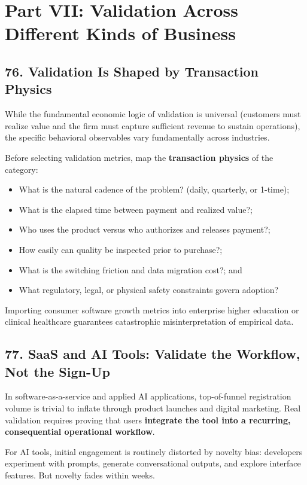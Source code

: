 \section*{Part VII: Validation Across Different Kinds of Business}

\subsection*{76. Validation Is Shaped by Transaction Physics}

While the fundamental economic logic of validation is universal (customers must realize value and the firm must capture sufficient revenue to sustain operations), the specific behavioral observables vary fundamentally across industries.

Before selecting validation metrics, map the \textbf{transaction physics} of the category:
\begin{itemize}
    \item What is the natural cadence of the problem? (daily, quarterly, or 1-time);
    \item What is the elapsed time between payment and realized value?;
    \item Who uses the product versus who authorizes and releases payment?;
    \item How easily can quality be inspected prior to purchase?;
    \item What is the switching friction and data migration cost?; and
    \item What regulatory, legal, or physical safety constraints govern adoption?
\end{itemize}

Importing consumer software growth metrics into enterprise higher education or clinical healthcare guarantees catastrophic misinterpretation of empirical data.

\subsection*{77. SaaS and AI Tools: Validate the Workflow, Not the Sign-Up}

In software-as-a-service and applied AI applications, top-of-funnel registration volume is trivial to inflate through product launches and digital marketing. Real validation requires proving that users \textbf{integrate the tool into a recurring, consequential operational workflow}.

For AI tools, initial engagement is routinely distorted by novelty bias: developers experiment with prompts, generate conversational outputs, and explore interface features. But novelty fades within weeks.

